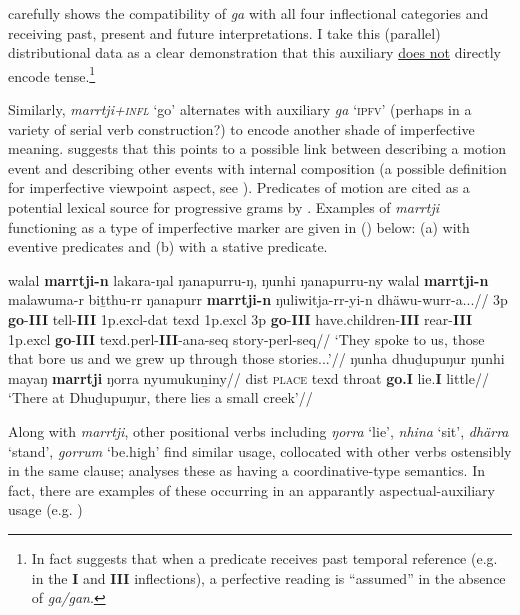 \citet[363-7]{Wilkinson1991} carefully shows the compatibility of \textit{ga} with all four inflectional categories and receiving past, present and future interpretations. I take this (parallel) distributional data as a clear demonstration that this auxiliary \ul{does not} directly encode tense.\footnote{In fact \citet[367]{Wilkinson1991} suggests that when a predicate receives past temporal reference (e.g. in the \textbf{I} and \textbf{III} inflections), a perfective reading is ``assumed'' in the absence of \textit{ga/gan}.}

Similarly, \textit{marrtji+\textsc{infl}} `go' alternates with auxiliary \textit{ga} `\textsc{ipfv'} (perhaps in a variety of serial verb construction?) to encode another shade of imperfective meaning. \citet[369]{Wilkinson1991} suggests that this points to a possible link between describing a motion event and describing other events with internal composition (a possible definition for imperfective viewpoint aspect, see \citealt[24]{Comrie1976}). Predicates of motion are cited as a potential lexical source for progressive grams by \citet[128]{Bybee1994}. Examples of \textit{marrtji} functioning as a type of imperfective marker are given in (\nextx) below: (a) with eventive predicates and (b) with a stative predicate.


\pex\a\begingl\gla walal \textbf{marrtji-n} lakara-ŋal ŋanapurru-ŋ, ŋunhi ŋanapurru-ny walal \textbf{ marrtji-n} malawuma-r biṯthu-rr ŋanapurr \textbf{marrtji-n} ŋuliwitja-rr-yi-n dhäwu-wurr-a...//
\glb 3p \textbf{go}-\textbf{III} tell-\textbf{III} 1p.\gls{excl}-\gls{dat} \gls{texd} 1p.\gls{excl} 3p \textbf{go}-\textbf{III} have.children-\textbf{III} rear-\textbf{III} 1p.\gls{excl} \textbf{go}-\textbf{III} \gls{texd}.\gls{perl}-\textbf{III}-\gls{ana}-\gls{seq} story-\gls{perl}-\gls{seq}//
\glft`They spoke to us, those that bore us and we grew up through those stories...'//\endgl
\a\begingl\gla ŋunha dhuḏupuŋur ŋunhi mayaŋ \textbf{marrtji} ŋorra nyumukuṉiny//
\glb \gls{dist} \textsc{place} \gls{texd} throat \textbf{go.I} lie.\textbf{I} little//
\glft`There at Dhuḏupuŋur, there lies a small creek'//\endgl
\xe

Along with \textit{marrtji}, other positional verbs including \textit{ŋorra} `lie', \textit{nhina} `sit', \textit{dhärra} `stand', \textit{gorrum} `be.high' find similar usage, collocated with other verbs ostensibly in the same clause; \citet[370]{Wilkinson1991} analyses these as having a coordinative-type semantics. In fact, there are examples of these occurring in an apparantly aspectual-auxiliary usage (e.g. )

